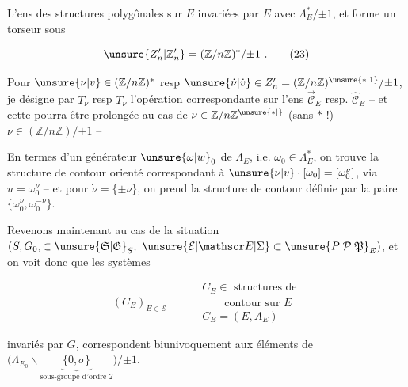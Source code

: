 L'ens des structures  polygônales sur $E$
invariées par $E$  avec
$\Lambda_E^*/\mathord{\pm}1$, et forme un torseur sous 

\[
 \unsure{Z'_n|\mathbb Z'_n}=(\mathbb Z/n\mathbb Z)^*/\mathord{\pm}1\ . \tag*{(23)}
\]

Pour $\unsure{\nu|v}\in(\mathbb Z/n\mathbb Z)^*$ resp $\unsure{\dot\nu|\dot v}\in Z'_n=(\mathbb Z/n\mathbb Z)^{\unsure{*|1}}/\mathord{\pm}1$,
je désigne par $T_\nu$ resp $T_{\dot\nu}$ l'opération
correspondante sur l'ens $\overrightarrow{\mathcal C}_E$ resp. $\widehat{\mathcal C}_E$ --
et cette   pourra
être prolongée au cas de $\nu\in\mathbb Z/n\mathbb Z^{\unsure{*|\vphantom{1}}}$ (sans $*$ !)
$\dot\nu\in(\mathbb Z/n\mathbb Z)/\mathord{\pm}1$ --


En termes d'un générateur $\unsure{\omega|w}_0$ de $\Lambda_E$,
i.e. $\omega_0\in\Lambda_E^*$, on trouve la structure de
contour orienté correspondant à $\unsure{\nu|v}\cdot[\omega_0]=[\omega_0^\nu]$,
via $u=\omega_0^\nu$ -- et pour $\dot\nu=\{\pm\nu\}$, on
prend la structure de contour définie par la
paire $\{\omega_0^\nu,\omega_0^{-\nu}\}$.

Revenons maintenant au cas de la situation
$(S,G_0,\subset\unsure{\mathfrak S|\mathfrak G}_S,\ \unsure{\mathcal E|\mathscr E|\Sigma}\subset\unsure{P|\mathcal P|\mathfrak P}_E)$, et on voit donc que les
systèmes

\[
 (C_E)_{E\in\mathcal E}\qquad
 \begin{aligned}
 &C_E\in\text{ structures de}\\
 &\hspace{2em}\text{contour sur }E\\
 &C_E=(E,A_E)
 \end{aligned}
\]

invariés par $G$, correspondent biunivoquement
aux éléments  de
$\bigl(\Lambda_{E_0}\smallsetminus\underbrace{\{0,\sigma\}}_{\text{sous-groupe d'ordre 2}}\bigr)/\mathord{\pm}1$.
 \unsure{$\ldots$}

